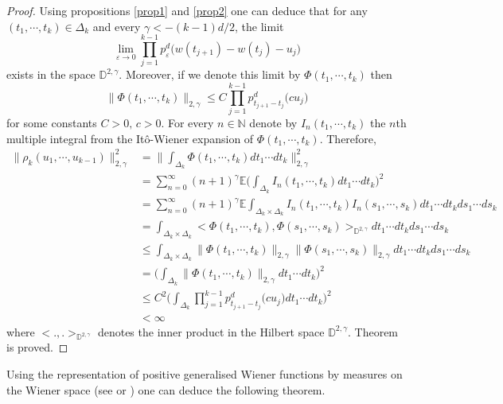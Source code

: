 \documentclass[]{interact}
\newcommand{\E}{{\mathbb{E}}}
\newcommand{\D}{{\mathbb{D}}}
\newcommand{\1}{\mathbf{1}}
\newcommand{\N}{{\mathbb N}}
\theoremstyle{plain}%
\theoremstyle{definition}
\theoremstyle{remark}
\begin{document}
\begin{proof}
Using propositions \ref{prop1} and \ref{prop2} one can deduce that for any $(t_1,\cdots,t_k)\in \Delta_k$ and every $\gamma <-(k-1)d/2 $, the limit 
$$ \lim_{\varepsilon \to 0} \prod_{j=1}^{k-1}  p^d_{\varepsilon}\big( w(t_{j+1})-w(t_j)-u_j\big) $$
exists in the space $\D^{2,\gamma}$. Moreover, if we denote this limit by $\Phi (t_1,\cdots,t_k)$ then
$$ \big \| \Phi (t_1,\cdots,t_k)  \big\| _{2,\gamma}  \leqslant C \prod_{j=1}^{k-1}  p^d_{t_{j+1}-t_j}\big( cu_j\big) $$
for some constants $C>0,\, c>0$. For every $n\in \N$ denote by $I_n(t_1, \cdots , t_k)$ the $n$th multiple integral from the It\^{o}-Wiener expansion of $\Phi(t_1, \cdots , t_k)$. Therefore,
\begin{align*}
\big \| \rho_k(u_1,\cdots,u_{k-1})  \big\| _{2,\gamma} ^2
&=\Big \| \int_{\Delta_k}  \Phi (t_1,\cdots,t_k)dt_1\cdots dt_k \Big\| _{2,\gamma} ^2\\
&= \sum_{n= 0}^{\infty} (n+1)^{\gamma }\E  \Big( \int_{\Delta_k}  I_n (t_1,\cdots,t_k) dt_1\cdots dt_k \Big)^2    \\
&= \sum_{n= 0}^{\infty} (n+1)^{\gamma }\E  \int_{\Delta_k \times \Delta_k}  I_n (t_1,\cdots,t_k)I_n (s_1,\cdots,s_k) dt_1\cdots dt_k ds_1\cdots ds_k    \\
&=  \int_{\Delta_k \times \Delta_k} \Big< \Phi (t_1,\cdots,t_k),\Phi (s_1,\cdots,s_k) \Big>_{\D^{2,\gamma}}  dt_1\cdots dt_k ds_1\cdots ds_k    \\
&\leqslant  \int_{\Delta_k \times \Delta_k} \big \| \Phi (t_1,\cdots,t_k)  \big\| _{2,\gamma} \big \| \Phi (s_1,\cdots,s_k)  \big\| _{2,\gamma} dt_1\cdots dt_k ds_1\cdots ds_k    \\
&=  \Big( \int_{\Delta_k } \big \| \Phi (t_1,\cdots,t_k)  \big\| _{2,\gamma}   dt_1\cdots dt_k  \Big)^2    \\
&\leqslant C^2  \Big( \int_{\Delta_k } \prod_{j=1}^{k-1}    p^d_{t_{j+1}-t_j}\big( cu_j\big)   dt_1\cdots dt_k  \Big)^2    \\
& <\infty
\end{align*}
where $\big< .,. \big>_{\D^{2,\gamma}}$ denotes the inner product in the Hilbert space $\D^{2,\gamma}$.
Theorem is proved.
\end{proof}


Using the representation of positive generalised Wiener functions by measures on the Wiener space (see \cite[Theorem 4.1]{Su88} or \cite[Theorem 5]{KSW95}) one can deduce the following theorem.
\end{document}
